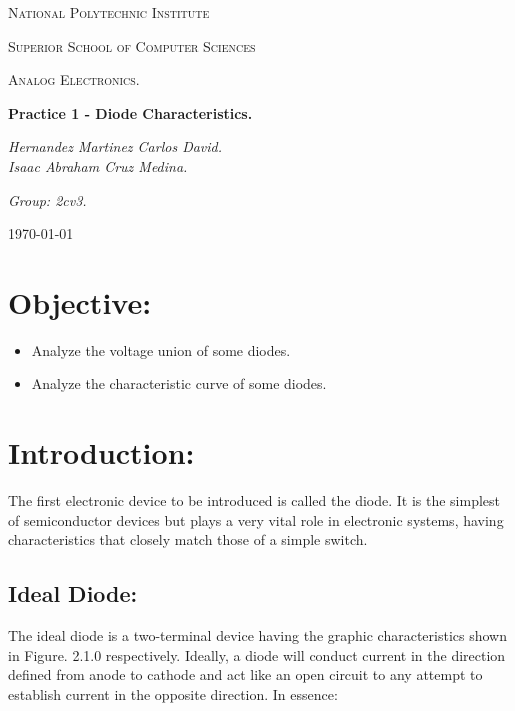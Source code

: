 \documentclass[10pt,a4paper]{article}
\begin{document}
\begin{titlepage}
	\centering
	{ \huge \scshape National Polytechnic Institute\par}
	{ \Large \scshape  Superior School of Computer Sciences\par }
	\vspace{1cm}
	{\scshape\Large Analog Electronics.\par}
	\vspace{1.5cm}
	{\Huge\bfseries Practice 1 - Diode Characteristics.\par}
	\vspace{2cm}
	{\Large\itshape Hernandez Martinez Carlos David. \\ Isaac Abraham Cruz Medina. \par}
	{\Large\itshape Group: 2cv3. \par}
	\vfill
	{\large \today\par} 
	\vfill
\end{titlepage}


\tableofcontents 
{}
\pagebreak

\section{Objective:}

\begin{itemize}
\item Analyze the voltage union of some diodes.
\item Analyze the characteristic curve of some diodes.
\end{itemize}

\pagebreak

\section{Introduction:}

The first electronic device to be introduced is called the diode. It is the simplest of semiconductor devices but plays a very vital role in electronic systems, having characteristics that closely match those of a simple switch.

\subsection{Ideal Diode:}

The ideal diode is a two-terminal device having the graphic characteristics shown in Figure. 2.1.0 respectively. Ideally, a diode will conduct current in the direction defined from anode to cathode and act like an open circuit to any attempt to establish current in the opposite direction. In essence: \hfill \break
\end{document}
